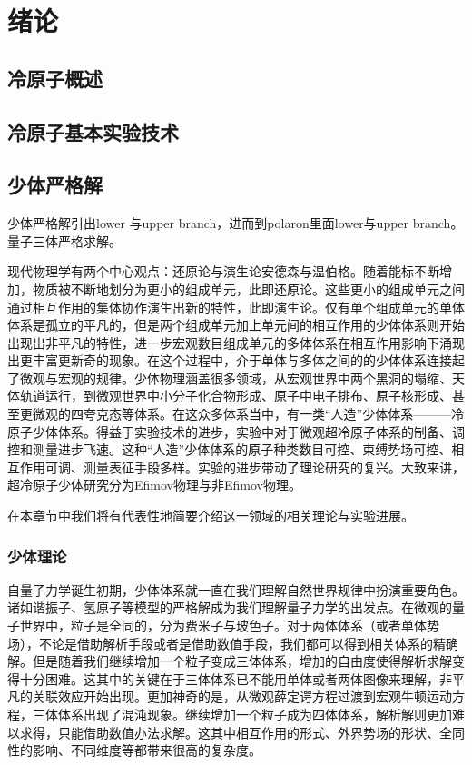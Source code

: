 \chapter{绪论}\label{chap:kondo}

\section{冷原子概述}


\section{冷原子基本实验技术}

\section{少体严格解}\label{sec:fewbody}
少体严格解引出lower 与upper branch，进而到polaron里面lower与upper branch。
量子三体严格求解。

现代物理学有两个中心观点：还原论与演生论{\color{red}安德森与温伯格}。随着能标不断增加，物质被不断地划分为更小的组成单元，此即还原论。这些更小的组成单元之间通过相互作用的集体协作演生出新的特性，此即演生论。仅有单个组成单元的单体体系是孤立的平凡的，但是两个组成单元加上单元间的相互作用的少体体系则开始出现出非平凡的特性，进一步宏观数目组成单元的多体体系在相互作用影响下涌现出更丰富更新奇的现象。在这个过程中，介于单体与多体之间的的少体体系连接起了微观与宏观的规律。少体物理涵盖很多领域，从宏观世界中两个黑洞的塌缩、天体轨道运行，到微观世界中小分子化合物形成、原子中电子排布、原子核形成、甚至更微观的四夸克态等体系。在这众多体系当中，有一类“人造”少体体系———冷原子少体体系。得益于实验技术的进步，实验中对于微观超冷原子体系的制备、调控和测量进步飞速。这种“人造”少体体系的原子种类数目可控、束缚势场可控、相互作用可调、测量表征手段多样。实验的进步带动了理论研究的复兴。大致来讲，超冷原子少体研究分为Efimov物理与非Efimov物理。

在本章节中我们将有代表性地简要介绍这一领域的相关理论与实验进展。

\subsection{少体理论}
自量子力学诞生初期，少体体系就一直在我们理解自然世界规律中扮演重要角色。诸如谐振子、氢原子等模型的严格解成为我们理解量子力学的出发点。在微观的量子世界中，粒子是全同的，分为费米子与玻色子。对于两体体系（或者单体势场），不论是借助解析手段或者是借助数值手段，我们都可以得到相关体系的精确解。但是随着我们继续增加一个粒子变成三体体系，增加的自由度使得解析求解变得十分困难。这其中的关键在于三体体系已不能用单体或者两体图像来理解，非平凡的关联效应开始出现。更加神奇的是，从微观薛定谔方程过渡到宏观牛顿运动方程，三体体系出现了混沌现象。继续增加一个粒子成为四体体系，解析解则更加难以求得，只能借助数值办法求解。这其中相互作用的形式、外界势场的形状、全同性的影响、不同维度等都带来很高的复杂度。


